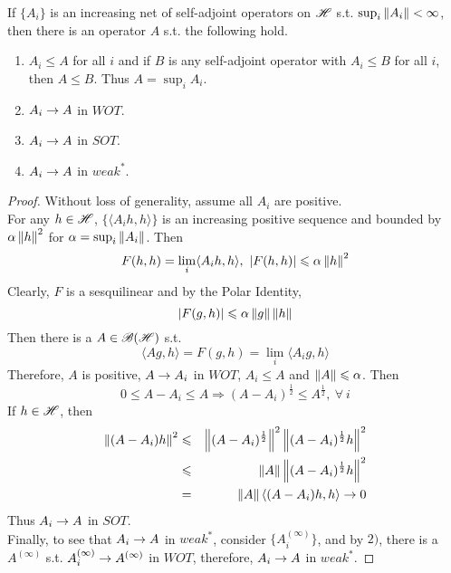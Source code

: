 \documentclass[a4paper,11pt]{report}
\begin{document}
\begin{prop}
	If $\{A_i\}$ is an increasing net of self-adjoint operators on $\mathscr{H}$ s.t. $\sup_i{\left\lVert A_i\right\lVert} < \infty$, then there is an operator $A$ s.t. the following hold.
	\begin{enumerate}[label = \arabic*)]
		\item $A_i \leqslant A$ for all $i$ and if $B$ is any self-adjoint operator with $A_i \leqslant B$ for all $i$, then $A \leqslant B$. Thus $A = \sup_i A_i$.
		\item $A_i \rightarrow A$ in $WOT$.
		\item $A_i \rightarrow A$ in $SOT$.
		\item $A_i \rightarrow A$ in $weak^{*}$.
	\end{enumerate}
\end{prop}
\begin{proof}
	Without loss of generality, assume all $A_i$ are positive.\\
	For any $h \in \mathscr{H}$, $\{\langle A_i h, h \rangle\}$ is an increasing positive sequence and bounded by $\alpha \left\lVert h\right\lVert^2$ for $\alpha = \sup_i{\left\lVert A_i\right\lVert}$. Then
	\begin{equation*}
		F(h,h) = \lim_i \langle A_i h, h \rangle,~ \left\lvert F(h,h)\right\lvert \leqslant \alpha \left\lVert h\right\lVert^2
	\end{equation*}
	Clearly, $F$ is a sesquilinear and by the Polar Identity, 
	\begin{equation*}
		\left\lvert F(g,h)\right\lvert \leqslant \alpha \left\lVert g\right\lVert \left\lVert h\right\lVert
	\end{equation*}
	Then there is a $A \in \mathscr{B(H)}$ s.t. 
	\begin{equation*}
		\langle Ag,h \rangle = F(g,h) = \lim_i \langle A_i g, h \rangle
	\end{equation*}
	Therefore, $A$ is positive, $A \rightarrow A_i$ in $WOT$, $A_i \leqslant A$ and $\left\lVert A\right\lVert \leqslant \alpha$. Then
	\begin{equation*}
		0 \leqslant A - A_i \leqslant A \Rightarrow (A-A_i)^{\frac{1}{2}} \leqslant A^{\frac{1}{2}},~ \forall~ i
	\end{equation*}
	If $h \in \mathscr{H}$, then
	\begin{eqnarray*}
		\left\lVert(A-A_i)h\right\lVert^2 &\leqslant& \left\lVert(A-A_i)^{\frac{1}{2}}\right\lVert^2 \left\lVert(A-A_i)^{\frac{1}{2}}h\right\lVert^2 \\
		&\leqslant& \left\lVert A\right\lVert \left\lVert(A-A_i)^{\frac{1}{2}}h\right\lVert^2 \\
		&=& \left\lVert A\right\lVert \langle (A-A_i)h,h  \rangle \rightarrow 0
	\end{eqnarray*}
	Thus $A_i \rightarrow A$ in $SOT$. \\
	Finally, to see that $A_i \rightarrow A$ in $weak^{*}$, consider $\{A_i^{(\infty)}\}$, and by $2)$, there is a $A^{(\infty)}$ s.t. $A_i^{(\infty)} \rightarrow A^{(\infty)}$ in $WOT$, therefore, $A_i \rightarrow A$ in $weak^{*}$.
\end{proof}
\end{document}
